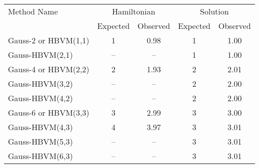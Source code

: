 \begin{tabular}{l|cccc}
\toprule
          Method Name & \multicolumn{2}{c}{Hamiltonian} & \multicolumn{2}{c}{Solution} \\
                      &    Expected & Observed & Expected & Observed \\
\midrule
 Gauss-2 or HBVM(1,1) &         1 &     0.98 &      1 &     1.00 \\
      Gauss-HBVM(2,1) &          -- &       -- &      1 &     1.00 \\
 Gauss-4 or HBVM(2,2) &         2 &     1.93 &      2 &     2.01 \\
      Gauss-HBVM(3,2) &          -- &       -- &      2 &     2.00 \\
      Gauss-HBVM(4,2) &          -- &       -- &      2 &     2.00 \\
 Gauss-6 or HBVM(3,3) &         3 &     2.99 &      3 &     3.00 \\
      Gauss-HBVM(4,3) &         4 &     3.97 &      3 &     3.01 \\
      Gauss-HBVM(5,3) &          -- &       -- &      3 &     3.01 \\
      Gauss-HBVM(6,3) &          -- &       -- &      3 &     3.01 \\
\bottomrule
\end{tabular}

